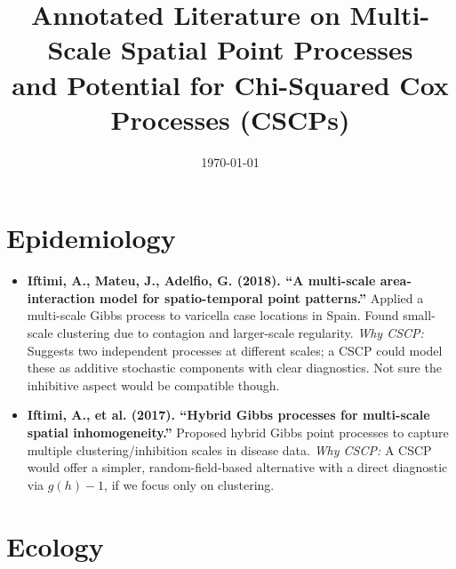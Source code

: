 \documentclass[11pt]{article}
\title{Annotated Literature on Multi-Scale Spatial Point Processes \\ and Potential for Chi-Squared Cox Processes (CSCPs)}
\author{}
\date{\today}
\begin{document}
	\maketitle
	
	\section*{Epidemiology}
	
	\begin{itemize}
		\item \textbf{Iftimi, A., Mateu, J., Adelfio, G. (2018). ``A multi-scale area-interaction model for spatio-temporal point patterns.''}  
		Applied a multi-scale Gibbs process to varicella case locations in Spain. Found small-scale clustering due to contagion and larger-scale regularity.  
		\emph{Why CSCP:} Suggests two independent processes at different scales; a CSCP could model these as additive stochastic components with clear diagnostics. Not sure the inhibitive aspect would be compatible though.
		
		\item \textbf{Iftimi, A., et al. (2017). ``Hybrid Gibbs processes for multi-scale spatial inhomogeneity.''}  
		Proposed hybrid Gibbs point processes to capture multiple clustering/inhibition scales in disease data.  
		\emph{Why CSCP:} A CSCP would offer a simpler, random-field-based alternative with a direct diagnostic via $g(h)-1$, if we focus only on clustering.
	\end{itemize}
	
	\section*{Ecology}
	
\end{document}
